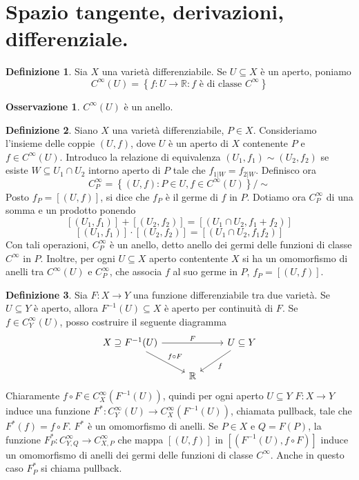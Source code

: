 \documentclass[a4paper,11pt]{article}
\theoremstyle{definition}
\newtheorem{osservazione}{Osservazione}[section]
\newtheorem{definizione}{Definizione}[section]
\theoremstyle{theorem}
\begin{document}
\section{Spazio tangente, derivazioni, differenziale.}
\begin{definizione}
	 Sia $X$ una varietà differenziabile. Se $U\subseteq X$ è un aperto, poniamo
	 \[C^\infty(U)=\left\{f\colon U\to\mathbb{R}:f\textrm{ è di classe }C^\infty \right\}\]
\end{definizione}
\begin{osservazione}
	$C^\infty(U)$ è un anello.
\end{osservazione}
\begin{definizione}
	Siano $X$ una varietà differenziabile, $P\in X$. Consideriamo l'insieme delle coppie $(U,f)$, dove $U$ è un aperto di $X$ contenente $P$ e $f\in C^\infty(U)$. Introduco la relazione di equivalenza $(U_1,f_1)\sim(U_2,f_2)$ se esiste $W\subseteq U_1\cap U_2$ intorno aperto di $P$ tale che $f_{1|W}=f_{2|W}$. Definisco ora
	\[C^\infty_P=\left\{(U,f):P\in U,f\in C^\infty(U)\right\}\slash\sim\]
	Posto $f_P=[(U,f)]$, si dice che $f_P$ è il germe di $f$ in $P$.
	Dotiamo ora $C^\infty_P$ di una somma e un prodotto ponendo
	\[[(U_1,f_1)]+[(U_2,f_2)]=[(U_1\cap U_2,f_1+f_2)]\]
	\[[(U_1,f_1)]\cdot[(U_2,f_2)]=[(U_1\cap U_2,f_1f_2)]\]
	Con tali operazioni, $C^\infty_P$ è un anello, detto anello dei germi delle funzioni di classe $C^\infty$ in $P$. Inoltre, per ogni $U\subseteq X$ aperto contentente $X$ si ha un omomorfismo di anelli tra $C^\infty(U)$ e $C^\infty_P$, che associa $f$ al suo germe in $P$, $f_P=[(U,f)]$.	
\end{definizione}
\begin{definizione}
	Sia $F\colon X\to Y$ una funzione differenziabile tra due varietà. Se $U\subseteq Y$ è aperto, allora $F^{-1}(U)\subseteq X$ è aperto per continuità di $F$. Se $f\in C^\infty_Y(U)$, posso costruire il seguente diagramma
	\[\begin{tikzcd}
	X\supseteq F^{-1}(U)\arrow[rr, "F"]\arrow[dr, "f\circ F"] & &U\subseteq Y\arrow[dl, "f"]\\
	& \mathbb{R}
	\end{tikzcd}\]
	Chiaramente $f\circ F\in C^\infty_X(F^{-1}(U))$, quindi per ogni aperto $U\subseteq Y$ $F\colon X\to Y$ induce una funzione $F^*\colon C^\infty_Y(U)\to C^\infty_X(F^{-1}(U))$, chiamata pullback, tale che $F^*(f)=f\circ F$. $F^*$ è un omomorfismo di anelli. Se $P\in X$ e $Q=F(P)$, la funzione $F^*_P\colon C^\infty_{Y,Q}\to C^\infty_{X,P}$ che mappa $[(U,f)]$ in $[(F^{-1}(U),f\circ F)]$ induce un omomorfismo di anelli dei germi delle funzioni di classe $C^\infty$. Anche in questo caso $F^*_P$ si chiama pullback.
\end{definizione}
\end{document}
